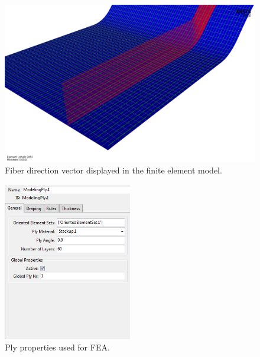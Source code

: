 \begin{figure}[htp]
\centering
\includegraphics[width=1\textwidth]{./figures/fea/fea-acp-fiber-direction}
\caption{Fiber direction vector displayed in the finite element model.}
\label{fig:fea-acp-fiber-direction}
\end{figure}


\begin{figure}[htp]
\centering
\includegraphics[width=0.5\textwidth]{./figures/fea/fea-acp-modeling-ply-properties}
\caption{Ply properties used for FEA.}
\label{fig:fea-acp-modeling-ply-properties}
\end{figure}


